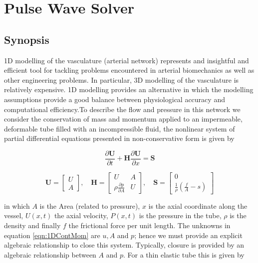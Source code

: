 \section{Pulse Wave Solver}

\subsection{Synopsis}

1D modelling of the vasculature (arterial network) represents and insightful and efficient tool for tackling problems encountered in arterial biomechanics as well as other engineering problems. In particular, 3D modelling of the vasculature is relatively expensive. 1D modelling provides an alternative in which the modelling assumptions provide a good balance between physiological accuracy and computational efficiency.To describe the flow and pressure in this network we consider the conservation of mass and momentum applied to an impermeable, deformable tube filled with an incompressible fluid, the nonlinear system of partial differential equations presented in non-conservative form is given by

\begin{equation}
\frac{\partial \mathbf{U}}{\partial{t}} + \mathbf{H}\frac{\partial{\mathbf{U}}}{\partial{x}} 
= \mathbf{S}
\label{eqn:1DContMom}
\end{equation}

\begin{equation}
\mathbf{U}=\begin{bmatrix} U \\ A \end{bmatrix}, \quad \mathbf{H}=\begin{bmatrix} U & A \\ \rho\frac{\partial{p}}{\partial{A}} & U\end{bmatrix}, \quad \mathbf{S}=\begin{bmatrix} 0 \\ \frac{1}{\rho}\left(\frac{f}{A}-s\right) \end{bmatrix} \nonumber
\end{equation}

in which $A$ is the Area (related to pressure), $x$ is the axial coordinate along the vessel, $U(x,t)$ the axial velocity, $P(x,t)$ is the pressure in the tube,  $\rho$ is the density and finally $f$ the frictional force per unit length. The unknowns in equation \ref{eqn:1DContMom} are $u, A$ and $p$; hence we must provide an explicit algebraic relationship to close this system. Typically, closure is provided by an algebraic relationship between $A$ and $p$. For a thin elastic tube this is given by

